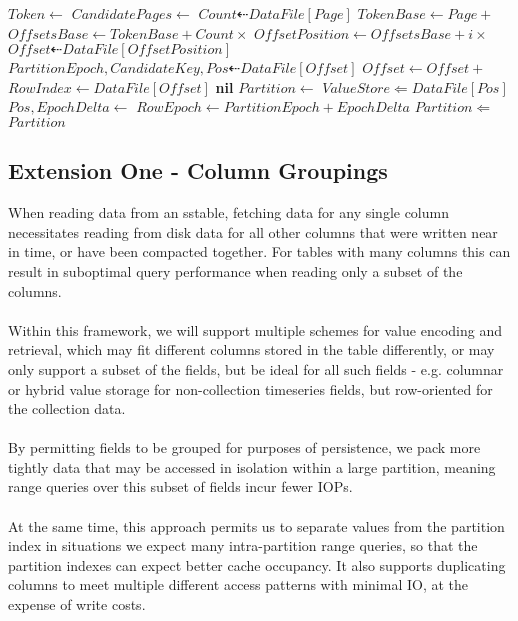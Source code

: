 \documentclass[fleqn]{article}
\begin{document}
\begin{algorithm}
\begin{algorithmic}[1]
\State $Token \gets $ 
\State $CandidatePages \gets $
 \State $Count \dashleftarrow DataFile[Page]$
 \State $TokenBase \gets Page +  $ 
 \State $OffsetsBase \gets TokenBase + Count \times $
 \For{$i \gets $ \Call{Find}{$DataFile[TokenBase \dots OffsetBase), Token$}}
  \State $OffsetPosition \gets OffsetsBase + i \times $ 
  \State $Offset \dashleftarrow DataFile[OffsetPosition]$
  \State $PartitionEpoch, CandidateKey, Pos \dashleftarrow DataFile[Offset]$
   \State $Offset \gets Offset + $ 
   \State $RowIndex \gets DataFile[Offset]$
   \State \Return {}
  \EndIf
 \EndFor
\EndFor
\Return \textbf{nil}
\EndFunction
\Statex
{}
\State $Partition \gets $ 
\State $ValueStore \Leftarrow DataFile[Pos]$
 \State $Pos, EpochDelta \gets$ 
 \State $RowEpoch \gets PartitionEpoch + EpochDelta$
 \State $Partition \Leftarrow $ 
\EndFor
\Return $Partition$
\EndFunction
\end{algorithmic}
\end{algorithm}

\clearpage
\subsection{Extension One - Column Groupings}
\small
When reading data from an sstable, fetching data for any single column necessitates 
reading from disk data for all other columns that were written near in time, or have
been compacted together. For tables with many columns this can result in suboptimal query
performance when reading only a subset of the columns.
\\\\ Within this framework, we will support multiple schemes for value encoding and retrieval, 
which may fit different columns stored in the table differently, or may only support a subset 
of the fields, but be ideal for all such fields - e.g. columnar or hybrid value storage for 
non-collection timeseries fields, but row-oriented for the collection data.
\\\\
By permitting fields to be grouped for purposes of persistence, we pack more tightly data
that may be accessed in isolation within a large partition, meaning range queries over this subset
of fields incur fewer IOPs. 
\\\\
At the same time, this approach permits us to separate values from the partition index in situations 
we expect many intra-partition range queries, so that the partition indexes can expect better cache occupancy.
It also supports duplicating columns to meet multiple different access patterns with minimal IO, at the expense
of write costs.
\end{document}
